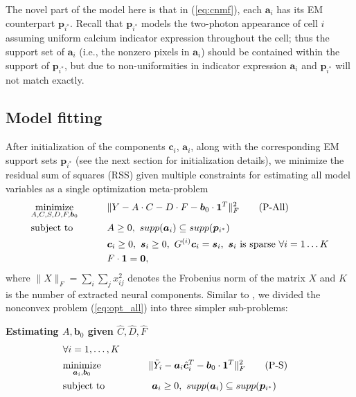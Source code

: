 \documentclass[10pt,letterpaper]{article}
\begin{document}
{The novel part of the model here is that in (\ref{eq:cnmf}), each $\bm{a}_i$ has its EM counterpart $\bm{p}_{i^*}$.  Recall that $\bm{p}_{i^*}$ models the two-photon appearance of cell $i$ assuming uniform calcium indicator expression throughout the cell; thus the support set of $\bm{a}_i$ (i.e., the nonzero pixels in $\bm{a}_i$) should be contained within the support of $\bm{p}_{i^*}$, but due to non-uniformities in indicator expression $\bm{a}_i$ and $\bm{p}_{i^*}$ will not match exactly.  

\subsection{Model fitting}
After initialization of the components $\bm{c}_i$, $\bm{a}_i$, along with the corresponding EM support sets $\bm{p}_{i^*}$ (see the next section for initialization details), we minimize the residual sum of squares (RSS) given multiple constraints 
for estimating all model variables as a single optimization meta-problem 
\begin{alignat}{2}
&\underset{A,C,S, D, F,\bm{b}_0}{\text{minimize}} &\qquad& \|Y-A\cdot C - D\cdot F- \bm{b}_0\cdot \bm{1}^T\|_F^2 \label{eq:opt_all}\tag{P-All}\\
&\text{subject to} &\quad& A\geq 0, ~supp(\bm{a}_i) \subseteq supp(\bm{p}_{i^*}) \notag\\
 &&&\bm{c}_i\geq 0,~ \bm{s}_i\geq 0, ~G^{(i)}\bm{c}_i = \bm{s}_i, ~ \bm{s}_i \text{ is sparse}~\forall i=1\ldots K\notag\\
&&& F\cdot \bm{1}= \bm{0}, \notag
\end{alignat}
where $\|X\|_F = \sum_i\sum_j x_{ij}^2$ denotes the Frobenius norm of the matrix $X$ and $K$ is the number of extracted neural components. Similar to \citep{Zhou2018}, we divided the nonconvex problem (\ref{eq:opt_all}) into three simpler sub-problems: 

\textbf{Estimating $A, \bm{b}_0$ given $\hat{C}, \hat{D}, \hat{F}$}
\begin{alignat}{2}
& \forall i=1, \hdots, K \notag\\
&\underset{\bm{a}_i,\bm{b}_0}{\text{minimize}} &\qquad& \|\tilde{Y}_i-{\bm{a}}_i\hat{\bm{c}}_i^T - \bm{b}_0\cdot \bm{1}^T\|_F^2 \label{eq:opt_A}\tag{P-S}\\
&\text{subject to}&&   ~\bm{a}_i \geq 0, ~supp(\bm{a}_i) \subseteq supp(\bm{p}_{i^*}) \notag
\end{alignat}

}
\end{document}

